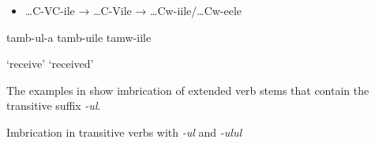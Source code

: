 \documentclass[output=paper]{langsci/langscibook}
\begin{document}
\begin{itemize}
\item \begin{stylelsLanginfo}
…C-VC-ile  →  …C-Vile  →  …Cw-iile/…Cw-eele
\end{stylelsLanginfo}\end{itemize}
\begin{stylelsSourceline}
  tamb-ul-a        tamb-uile    tamw-iile
\end{stylelsSourceline}

\begin{stylelsTranslation}
‘receive’          ‘received’
\end{stylelsTranslation}

The examples in  show imbrication of extended verb stems that contain the transitive suffix \textit{{}-}\emph{ul}.

\begin{stylelsTableHeading}%
\begin{table}
\caption{Imbrication in transitive verbs with \textit{{}-}\emph{ul} and \textit{{}-}\emph{ulul}}
\label{tab:23}
\end{table}\end{stylelsTableHeading}
\end{document}
